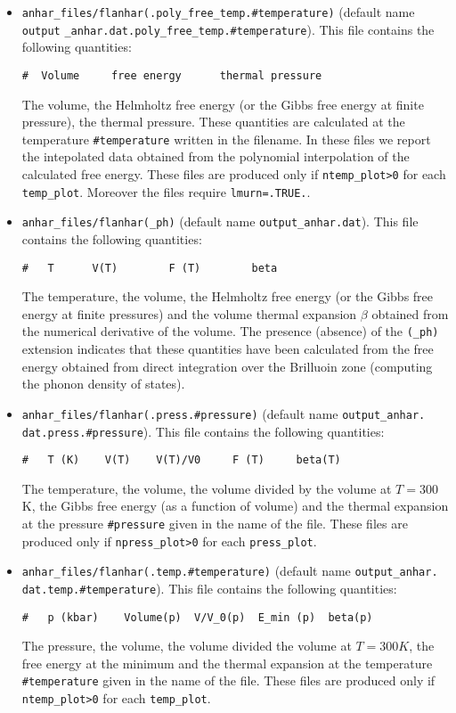 \documentclass[12pt,a4paper,twoside]{report}
\begin{document}
\begin{itemize}
\item
\texttt{anhar\_files/flanhar(.poly\_free\_temp.\#temperature)} (default name \texttt{output} \texttt{\_anhar.dat.poly\_free\_temp.\#temperature}).
This file contains the following quantities:
\begin{verbatim}
#  Volume     free energy      thermal pressure 
\end{verbatim}
The volume, the Helmholtz free energy (or the Gibbs free
energy at finite pressure), the thermal pressure.
These quantities are calculated at the temperature \texttt{\#temperature} 
written in the filename.
In these files we report the intepolated data obtained from the
polynomial interpolation of the calculated free energy.
These files are produced only if \texttt{ntemp\_plot>0} for each
\texttt{temp\_plot}. Moreover the files require \texttt{lmurn=.TRUE.}.

\item 
\texttt{anhar\_files/flanhar(\_ph)} (default name \texttt{output\_anhar.dat}).
This file contains the following quantities:
\begin{verbatim}
#   T      V(T)        F (T)        beta 
\end{verbatim}
The temperature, the volume, the Helmholtz free energy (or the Gibbs free
energy at finite pressures) and the volume
thermal expansion $\beta$ obtained from the numerical derivative of the
volume. 
The presence (absence) of the \texttt{(\_ph)} extension indicates that
these quantities have been calculated from the free energy obtained from 
direct integration over the Brilluoin zone (computing the phonon density
of states). 

\item
\texttt{anhar\_files/flanhar(.press.\#pressure)} (default name \texttt{output\_anhar.} \texttt{dat.press.\#pressure}).
This file contains the following quantities:
\begin{verbatim}
#   T (K)    V(T)    V(T)/V0     F (T)     beta(T) 
\end{verbatim}
The temperature, the volume, the volume divided by the volume at $T=300$ K,
the Gibbs free energy (as a function of volume) and the thermal expansion
at the pressure \texttt{\#pressure} given in the name of the file.
These files are produced only if \texttt{npress\_plot>0} for each
\texttt{press\_plot}. 

\item
\texttt{anhar\_files/flanhar(.temp.\#temperature)} (default name \texttt{output\_anhar.} \texttt{dat.temp.\#temperature}).
This file contains the following quantities:
\begin{verbatim}
#   p (kbar)    Volume(p)  V/V_0(p)  E_min (p)  beta(p)
\end{verbatim}
The pressure, the volume, the volume divided the volume at $T=300 K$, 
the free energy at the minimum and the thermal 
expansion at the temperature \texttt{\#temperature} given in the name 
of the file.
These files are produced only if \texttt{ntemp\_plot>0} for each
\texttt{temp\_plot}. 


\end{itemize}
\end{document}
